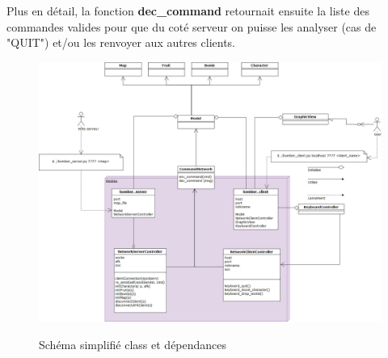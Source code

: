 \documentclass[a4paper]{article}
\begin{document}
Plus en détail, la fonction \textbf{dec\_command} retournait ensuite la liste des commandes valides pour que du coté serveur on puisse les analyser (cas de "QUIT") et/ou les renvoyer aux autres clients.


\begin{figure}[!htbp]
	\centering
	\includegraphics[width=\textwidth]{IMG_Latex/Classes.jpg}\\
	\caption{Schéma simplifié class et dépendances}
	\label{shema/globalproject}
\end{figure}
\end{document}

